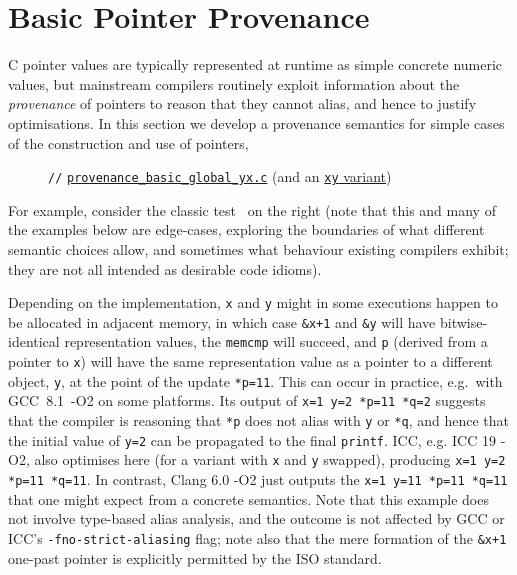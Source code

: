 \documentclass[acmsmall,review,screen]{acmart}\settopmatter{printfolios=true,printccs=false,printacmref=false}
\newcommand{\mytesturl}[1]{https://cerberus.cl.cam.ac.uk/cerberus?defacto/#1}
\newcommand{\mytestlink}[2]{\href{\mytesturl{#1}}{#2}}
\newcommand{\mylistingmargin}{5mm}
\newcommand{\myfoolinkexample}[4]{{\vspace*{-0.5\baselineskip}\par{\noindent\small\hspace*{\mylistingmargin}\lstinline{//} #4\vspace*{0.25\baselineskip}\par}}}
\begin{document}
\section{Basic Pointer Provenance}\label{sec:prov}

C pointer values are typically represented at runtime as simple
concrete numeric values, but mainstream compilers routinely exploit
information about the \emph{provenance} of pointers to reason that they
cannot alias, and hence to justify optimisations.
In this section we develop a provenance semantics for simple cases of
the construction and use of pointers, 

%
\begin{figure}
{\renewcommand{\mylistingmargin}{0mm}\myfoolinkexample{charon_tests/}{provenance_basic_global_yx.c}{}{\mytestlink{provenance_basic_global_yx.c}{\lstinline{provenance_basic_global_yx.c}}
(and an \mytestlink{provenance_basic_global_xy.c}{\texttt{xy} variant})}%
}
\vspace*{-\baselineskip}
\end{figure}
For example, consider
 the classic test~\cite{dr260,N1637,krebbers-phd,N2013,Cerberus-PLDI16}
 on the right
(note that this and many of the examples below are edge-cases,
exploring the boundaries of what different semantic choices allow,
and sometimes 
what behaviour existing compilers exhibit;
they are not all intended as desirable code idioms).

Depending on the implementation, 
 \lstinline{x} and \lstinline{y} might  in some executions
happen to be allocated in adjacent memory, in which case 
 \lstinline{&x+1} and \lstinline{&y} will have bitwise-identical representation values, the \lstinline{memcmp} will succeed, and
\lstinline{p} (derived from a pointer
to \lstinline{x}) will have the same
representation value as a pointer to a different object, \lstinline{y}, at the point of the
update \lstinline{*p=11}. This can occur in practice, e.g.~with \mbox{GCC
8.1 -O2} on some platforms. Its output of
%
\texttt{x=1 y=2 *p=11 *q=2}
%
suggests that the compiler is reasoning that \lstinline{*p} does not alias with \lstinline{y} or \lstinline{*q}, and
hence that the initial value of \lstinline{y=2} can be propagated to the
final \lstinline{printf}.
%
ICC, e.g. ICC 19 -O2, also optimises here
(for a variant with \texttt{x} and \texttt{y} swapped),  producing \texttt{x=1 y=2 *p=11 *q=11}.
In contrast, Clang 6.0 -O2 just outputs the 
\texttt{x=1 y=11 *p=11 *q=11} that one might expect from a concrete
semantics.
Note that this example does not involve type-based alias analysis, and
the outcome is not affected by GCC or ICC's \lstinline{-fno-strict-aliasing}
flag;
note also that the mere formation of the \lstinline{&x+1} one-past pointer 
is explicitly permitted by the ISO standard.
\end{document}
